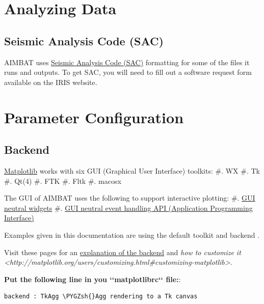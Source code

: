 \documentclass[letterpaper,10pt,english]{sphinxmanual}
\def\PYGZsh{\char`\#}
\begin{document}
\chapter{Analyzing Data}
\label{docfiles/analyzingData:analyzing-data}\label{docfiles/analyzingData::doc}

\section{Seismic Analysis Code (SAC)}
\label{docfiles/analyzingData:seismic-analysis-code-sac}
AIMBAT uses \href{http://www.iris.edu/files/sac-manual/}{Seismic Analysis Code (SAC)} formatting for some of the files it runs and outputs. To get SAC, you will need to fill out a software request form available on the IRIS website.


\chapter{Parameter Configuration}
\label{docfiles/parameterConfiguration:parameter-configuration}\label{docfiles/parameterConfiguration::doc}

\section{Backend}
\label{docfiles/parameterConfiguration:backend}
\href{http://matplotlib.org/contents.html}{Matplotlib} works with six GUI (Graphical User Interface) toolkits:
\#. WX
\#. Tk
\#. Qt(4)
\#. FTK
\#. Fltk
\#. macosx

The GUI of AIMBAT uses the following to support interactive plotting:
\#. \href{http://matplotlib.org/api/widgets\_api.html}{GUI neutral widgets}
\#. \href{http://matplotlib.org/users/event\_handling.html}{GUI neutral event handling API (Application Programming Interface)}

Examples given in this documentation are using the default toolkit  and backend .

Visit these pages for an \href{http://matplotlib.org/faq/usage\_faq.html\#what-is-a-backend}{explanation of the backend} and \emph{how to customize it \textless{}http://matplotlib.org/users/customizing.html\#customizing-matplotlib\textgreater{}}.

\textbf{Put the following line in you {}`{}`matplotlibrc{}`{}` file:}:

\begin{Verbatim}[commandchars=\\\{\}]
backend : TkAgg \PYGZsh{}Agg rendering to a Tk canvas
\end{Verbatim}
\end{document}
